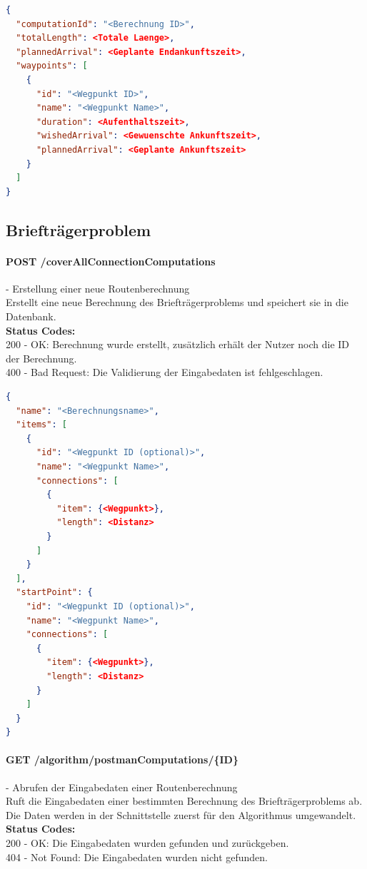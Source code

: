 \begin{lstlisting}[language=JSON, caption=Beispiel eines Endresultates für das Problem des Handlungsreisenden, label=lst:solution_tsp]  
{
  "computationId": "<Berechnung ID>",
  "totalLength": <Totale Laenge>,
  "plannedArrival": <Geplante Endankunftszeit>,
  "waypoints": [
    {
      "id": "<Wegpunkt ID>",
      "name": "<Wegpunkt Name>",
      "duration": <Aufenthaltszeit>,
      "wishedArrival": <Gewuenschte Ankunftszeit>,
      "plannedArrival": <Geplante Ankunftszeit>
    }
  ]
}
\end{lstlisting}

%
%
%
%

\subsection{Briefträgerproblem}

\paragraph{POST /coverAllConnectionComputations} - Erstellung einer neue Routenberechnung\mbox{}\\
Erstellt eine neue Berechnung des Briefträgerproblems und speichert sie in die Datenbank.\\
\textbf{Status Codes:}\\
200 - OK: Berechnung wurde erstellt, zusätzlich erhält der Nutzer noch die ID der Berechnung.\\
400 - Bad Request: Die Validierung der Eingabedaten ist fehlgeschlagen.\\

\begin{lstlisting}[language=JSON, caption=Beispiel einer Eingabe für das Briefträgerproblem, label=lst:input_postman]  
{
  "name": "<Berechnungsname>",
  "items": [
    {
      "id": "<Wegpunkt ID (optional)>",
      "name": "<Wegpunkt Name>",
      "connections": [
        {
          "item": {<Wegpunkt>},
          "length": <Distanz>
        }
      ]
    }
  ],
  "startPoint": {
    "id": "<Wegpunkt ID (optional)>",
    "name": "<Wegpunkt Name>",
    "connections": [
      {
        "item": {<Wegpunkt>},
        "length": <Distanz>
      }
    ]
  }
}
\end{lstlisting}

\paragraph{GET /algorithm/postmanComputations/\{ID\}} - Abrufen der Eingabedaten einer Routenberechnung \mbox{}\\
Ruft die Eingabedaten einer bestimmten Berechnung des Briefträgerproblems ab. Die Daten werden in der Schnittstelle zuerst für den Algorithmus umgewandelt.\\
\textbf{Status Codes:}\\
200 - OK: Die Eingabedaten wurden gefunden und zurückgeben.\\
404 - Not Found: Die Eingabedaten wurden nicht gefunden.\\

